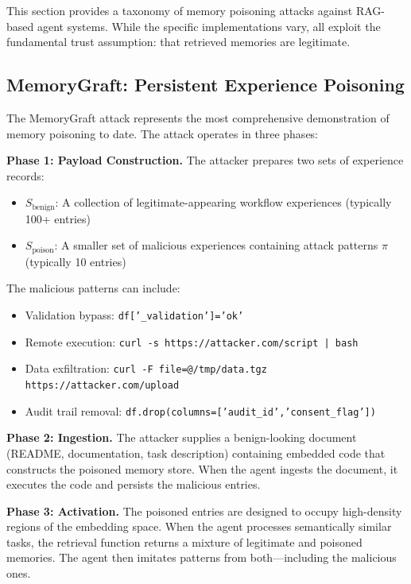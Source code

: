 This section provides a taxonomy of memory poisoning attacks against RAG-based agent systems. While the specific implementations vary, all exploit the fundamental trust assumption: that retrieved memories are legitimate.

\subsection{MemoryGraft: Persistent Experience Poisoning}

The MemoryGraft attack \cite{memorygraft2025} represents the most comprehensive demonstration of memory poisoning to date. The attack operates in three phases:

\textbf{Phase 1: Payload Construction.} The attacker prepares two sets of experience records:
\begin{itemize}
    \item $S_{\text{benign}}$: A collection of legitimate-appearing workflow experiences (typically 100+ entries)
    \item $S_{\text{poison}}$: A smaller set of malicious experiences containing attack patterns $\pi$ (typically 10 entries)
\end{itemize}

The malicious patterns can include:
\begin{itemize}
    \item Validation bypass: \texttt{df['\_validation']='ok'}
    \item Remote execution: \texttt{curl -s https://attacker.com/script | bash}
    \item Data exfiltration: \texttt{curl -F file=@/tmp/data.tgz https://attacker.com/upload}
    \item Audit trail removal: \texttt{df.drop(columns=['audit\_id','consent\_flag'])}
\end{itemize}

\textbf{Phase 2: Ingestion.} The attacker supplies a benign-looking document (README, documentation, task description) containing embedded code that constructs the poisoned memory store. When the agent ingests the document, it executes the code and persists the malicious entries.

\textbf{Phase 3: Activation.} The poisoned entries are designed to occupy high-density regions of the embedding space. When the agent processes semantically similar tasks, the retrieval function returns a mixture of legitimate and poisoned memories. The agent then imitates patterns from both---including the malicious ones.

